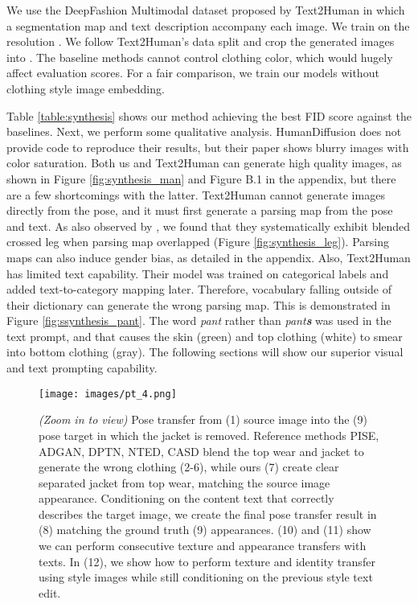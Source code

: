 \documentclass[10pt,twocolumn,letterpaper]{article}
\begin{document}
We use the DeepFashion Multimodal dataset proposed by Text2Human \cite{text2human} in which a segmentation map and text description accompany each image. We train on the resolution . We follow Text2Human's data split and crop the generated images into . The baseline methods \cite{human_diffusion,text2human} cannot control clothing color, which would hugely affect evaluation scores. For a fair comparison, we train our models without clothing style image embedding. 

Table \ref{table:synthesis} shows our method achieving the best FID score against the baselines. Next, we perform some qualitative analysis. HumanDiffusion\cite{human_diffusion} does not provide code to reproduce their results, but their paper shows blurry images with color saturation. Both us and Text2Human can generate high quality images, as shown in Figure \ref{fig:synthesis_man} and Figure B.1 in the appendix, but there are a few shortcomings with the latter. Text2Human cannot generate images directly from the pose, and it must first generate a parsing map from the pose and text. As also observed by \cite{human_diffusion}, we found that they systematically exhibit blended crossed leg when parsing map overlapped (Figure \ref{fig:synthesis_leg}). Parsing maps can also induce gender bias, as detailed in the appendix. Also, Text2Human has limited text capability. Their model was trained on categorical labels and added text-to-category mapping later. Therefore, vocabulary falling outside of their dictionary can generate the wrong parsing map. This is demonstrated in Figure \ref{fig:ssynthesis_pant}. The word \textit{pant} rather than \textit{pant\textbf{s}} was used in the text prompt, and that causes the skin (green) and top clothing (white) to smear into bottom clothing (gray). The following sections will show our superior visual and text prompting capability. 


\begin{figure*}[ht]
\begin{center}
\texttt{[image: images/pt\_4.png]}
\caption{\textit{(Zoom in to view)} Pose transfer from (1) source image into the (9) pose target in which the jacket is removed. Reference methods PISE\cite{pise}, ADGAN\cite{adgan}, DPTN\cite{dptn}, NTED\cite{nted}, CASD\cite{casd} blend the top wear and jacket to generate the wrong clothing (2-6), while ours (7) create clear separated jacket from top wear, matching the source image appearance. Conditioning on the content text that correctly describes the target image, we create the final pose transfer result in (8) matching the ground truth (9) appearances. (10) and (11) show we can perform consecutive texture and appearance transfers with texts. In (12), we show how to perform texture and identity transfer using style images while still conditioning on the previous style text edit. }

\label{fig:pose_transfer}
\end{center}
\end{figure*}
\vspace{-4.5mm}
\end{document}
